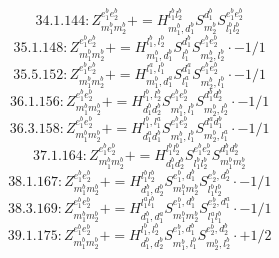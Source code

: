 \documentclass[letterpaper,10pt,fleqn,leqno,onecolumn]{article}
\begin{document}
\begin{equation} \;\;\;\;\;\;  34.1.144: Z^{e_{1}^{b}e_{2}^{b}}_{m_{1}^{b}m_{2}^{b}}+=H^{l_{1}^{b}l_{2}^{b}}_{m_{1}^{b},d_{1}^{b}}S^{d_{1}^{b}}_{m_{2}^{b}}S^{e_{1}^{b}e_{2}^{b}}_{l_{1}^{b}l_{2}^{b}} \end{equation}
\begin{equation} \;\;\;\;\;\;  35.1.148: Z^{e_{1}^{b}e_{2}^{b}}_{m_{1}^{b}m_{2}^{b}}+=H^{l_{1}^{b},l_{2}^{b}}_{m_{1}^{b},d_{1}^{b}}S^{d_{1}^{b}}_{l_{1}^{b}}S^{e_{1}^{b}e_{2}^{b}}_{m_{2}^{b},l_{2}^{b}}\cdot -1/1 \end{equation}
\begin{equation} \;\;\;\;\;\;  35.5.152: Z^{e_{1}^{b}e_{2}^{b}}_{m_{1}^{b}m_{2}^{b}}+=H^{l_{1}^{a},l_{1}^{b}}_{m_{1}^{b},d_{1}^{a}}S^{d_{1}^{a}}_{l_{1}^{a}}S^{e_{1}^{b}e_{2}^{b}}_{m_{2}^{b},l_{1}^{b}}\cdot -1/1 \end{equation}
\begin{equation} \;\;\;\;\;\;  36.1.156: Z^{e_{1}^{b}e_{2}^{b}}_{m_{1}^{b}m_{2}^{b}}+=H^{l_{1}^{b},l_{2}^{b}}_{d_{1}^{b}d_{2}^{b}}S^{e_{1}^{b}e_{2}^{b}}_{m_{1}^{b},l_{1}^{b}}S^{d_{1}^{b}d_{2}^{b}}_{m_{2}^{b},l_{2}^{b}}\cdot -1/1 \end{equation}
\begin{equation} \;\;\;\;\;\;  36.3.158: Z^{e_{1}^{b}e_{2}^{b}}_{m_{1}^{b}m_{2}^{b}}+=H^{l_{1}^{b},l_{1}^{a}}_{d_{1}^{a}d_{1}^{b}}S^{e_{1}^{b}e_{2}^{b}}_{m_{1}^{b},l_{1}^{b}}S^{d_{1}^{a}d_{1}^{b}}_{m_{2}^{b},l_{1}^{a}}\cdot -1/1 \end{equation}
\begin{equation} \;\;\;\;\;\;  37.1.164: Z^{e_{1}^{b}e_{2}^{b}}_{m_{1}^{b}m_{2}^{b}}+=H^{l_{1}^{b}l_{2}^{b}}_{d_{1}^{b}d_{2}^{b}}S^{e_{1}^{b}e_{2}^{b}}_{l_{1}^{b}l_{2}^{b}}S^{d_{1}^{b}d_{2}^{b}}_{m_{1}^{b}m_{2}^{b}} \end{equation}
\begin{equation} \;\;\;\;\;\;  38.1.167: Z^{e_{1}^{b}e_{2}^{b}}_{m_{1}^{b}m_{2}^{b}}+=H^{l_{1}^{b}l_{2}^{b}}_{d_{1}^{b},d_{2}^{b}}S^{e_{1}^{b},d_{1}^{b}}_{m_{1}^{b}m_{2}^{b}}S^{e_{2}^{b},d_{2}^{b}}_{l_{1}^{b}l_{2}^{b}}\cdot -1/1 \end{equation}
\begin{equation} \;\;\;\;\;\;  38.3.169: Z^{e_{1}^{b}e_{2}^{b}}_{m_{1}^{b}m_{2}^{b}}+=H^{l_{1}^{a}l_{1}^{b}}_{d_{1}^{b},d_{1}^{a}}S^{e_{1}^{b},d_{1}^{b}}_{m_{1}^{b}m_{2}^{b}}S^{e_{2}^{b},d_{1}^{a}}_{l_{1}^{a}l_{1}^{b}}\cdot -1/1 \end{equation}
\begin{equation} \;\;\;\;\;\;  39.1.175: Z^{e_{1}^{b}e_{2}^{b}}_{m_{1}^{b}m_{2}^{b}}+=H^{l_{1}^{b},l_{2}^{b}}_{d_{1}^{b},d_{2}^{b}}S^{e_{1}^{b},d_{1}^{b}}_{m_{1}^{b},l_{1}^{b}}S^{e_{2}^{b},d_{2}^{b}}_{m_{2}^{b},l_{2}^{b}}\cdot +1/2 \end{equation}
\end{document}
